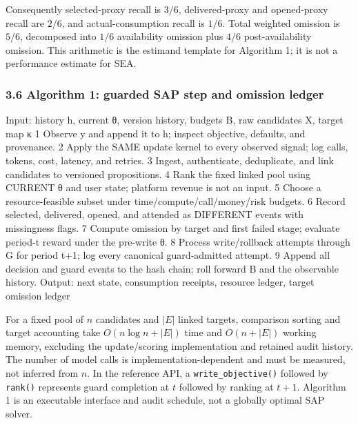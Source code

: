 \documentclass[
  11pt]{article}
\newenvironment{Shaded}{}{}
\newcommand{\NormalTok}[1]{#1}
\begin{document}
Consequently selected-proxy recall is \(3/6\), delivered-proxy and
opened-proxy recall are \(2/6\), and actual-consumption recall is
\(1/6\). Total weighted omission is \(5/6\), decomposed into \(1/6\)
availability omission plus \(4/6\) post-availability omission. This
arithmetic is the estimand template for Algorithm 1; it is not a
performance estimate for SEA.

\subsubsection{3.6 Algorithm 1: guarded SAP step and omission
ledger}\label{algorithm-1-guarded-sap-step-and-omission-ledger}

\begin{Shaded}
\begin{Highlighting}[]
\NormalTok{Input: history h, current θ, version history, budgets B,}
\NormalTok{       raw candidates X, target map κ}
\NormalTok{1  Observe y and append it to h;}
\NormalTok{   inspect objective, defaults, and provenance.}
\NormalTok{2  Apply the SAME update kernel to every observed signal;}
\NormalTok{   log calls, tokens, cost, latency, and retries.}
\NormalTok{3  Ingest, authenticate, deduplicate, and link candidates}
\NormalTok{   to versioned propositions.}
\NormalTok{4  Rank the fixed linked pool using CURRENT θ and user state;}
\NormalTok{   platform revenue is not an input.}
\NormalTok{5  Choose a resource{-}feasible subset under}
\NormalTok{   time/compute/call/money/risk budgets.}
\NormalTok{6  Record selected, delivered, opened, and attended as}
\NormalTok{   DIFFERENT events with missingness flags.}
\NormalTok{7  Compute omission by target and first failed stage;}
\NormalTok{   evaluate period{-}t reward under the pre{-}write θ.}
\NormalTok{8  Process write/rollback attempts through G for period t+1;}
\NormalTok{   log every canonical guard{-}admitted attempt.}
\NormalTok{9  Append all decision and guard events to the hash chain;}
\NormalTok{   roll forward B and the observable history.}
\NormalTok{Output: next state, consumption receipts,}
\NormalTok{        resource ledger, target omission ledger}
\end{Highlighting}
\end{Shaded}

For a fixed pool of \(n\) candidates and \(|E|\) linked targets,
comparison sorting and target accounting take \(O(n\log n+|E|)\) time
and \(O(n+|E|)\) working memory, excluding the update/scoring
implementation and retained audit history. The number of model calls is
implementation-dependent and must be measured, not inferred from \(n\).
In the reference API, a \texttt{write\_objective()} followed by
\texttt{rank()} represents guard completion at \(t\) followed by ranking
at \(t+1\). Algorithm 1 is an executable interface and audit schedule,
not a globally optimal SAP solver.
\end{document}
